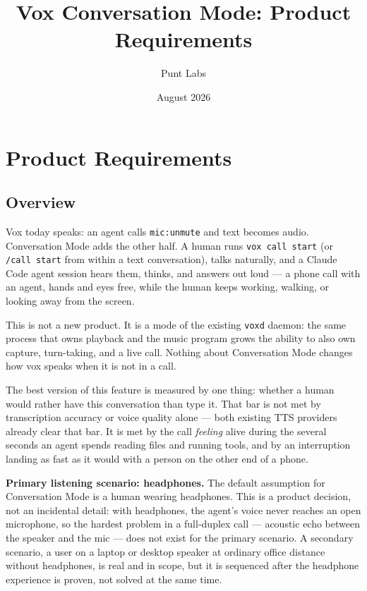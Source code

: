 \documentclass[a4paper,11pt]{report}
\begin{document}
\title{Vox Conversation Mode: Product Requirements}
\author{Punt Labs}
\date{August 2026}
\maketitle
\tableofcontents

\chapter{Product Requirements}

\section{Overview}

Vox today speaks: an agent calls \texttt{mic:unmute} and text becomes audio.
Conversation Mode adds the other half. A human runs \texttt{vox call start}
(or \texttt{/call start} from within a text conversation), talks
naturally, and a Claude Code agent session hears them, thinks, and answers
out loud --- a phone call with an agent, hands and eyes free, while the
human keeps working, walking, or looking away from the screen.

This is not a new product. It is a mode of the existing \texttt{voxd}
daemon: the same process that owns playback and the music program grows the
ability to also own capture, turn-taking, and a live call. Nothing about
Conversation Mode changes how vox speaks when it is not in a call.

The best version of this feature is measured by one thing: whether a human
would rather have this conversation than type it. That bar is not met by
transcription accuracy or voice quality alone --- both existing TTS
providers already clear that bar. It is met by the call \emph{feeling}
alive during the several seconds an agent spends reading files and running
tools, and by an interruption landing as fast as it would with a person on
the other end of a phone.

\textbf{Primary listening scenario: headphones.} The default assumption for
Conversation Mode is a human wearing headphones. This is a product decision,
not an incidental detail: with headphones, the agent's voice never reaches
an open microphone, so the hardest problem in a full-duplex call ---
acoustic echo between the speaker and the mic --- does not exist for the
primary scenario. A secondary scenario, a user on a laptop or desktop
speaker at ordinary office distance without headphones, is real and in
scope, but it is sequenced after the headphone experience is proven, not
solved at the same time.
\end{document}
